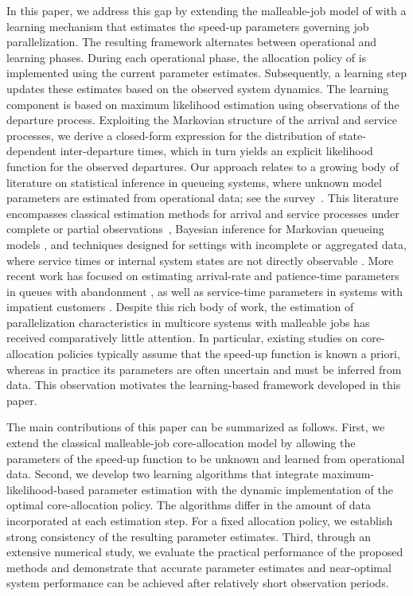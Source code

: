 \documentclass[11pt]{article}
\theoremstyle{remark}
\theoremstyle{definition}
\numberwithin{equation}{section}
\begin{document}
In this paper, we address this gap by extending the malleable-job model of \cite{berg2017} with a learning mechanism that estimates the speed-up parameters governing job parallelization. The resulting framework alternates between operational and learning phases. During each operational phase, the allocation policy of \cite{berg2017} is implemented using the current parameter estimates. Subsequently, a learning step updates these estimates based on the observed system dynamics.
The learning component is based on maximum likelihood estimation using observations of the departure process. Exploiting the Markovian structure of the arrival and service processes, we derive a closed-form expression for the distribution of state-dependent inter-departure times, which in turn yields an explicit likelihood function for the observed departures.
Our approach relates to a growing body of literature on statistical inference in queueing systems, where unknown model parameters are estimated from operational data; see the survey~\cite{asanjarani2021survey}. This literature encompasses classical estimation methods for arrival and service processes under complete or partial observations~\cite{larson1990queue, ross2007estimation}, Bayesian inference for Markovian queueing models \cite{armero1994bayesian}, and techniques designed for settings with incomplete or aggregated data, where service times or internal system states are not directly observable \cite{basawa2008, whitt2012fitting}. More recent work has focused on estimating arrival-rate and patience-time parameters in queues with abandonment \cite{bodas2023, inoue2023}, as well as service-time parameters in systems with impatient customers \cite{podorojnyi2026estimating}.
Despite this rich body of work, the estimation of parallelization characteristics in multicore systems with malleable jobs has received comparatively little attention. In particular, existing studies on core-allocation policies typically assume that the speed-up function is known a priori, whereas in practice its parameters are often uncertain and must be inferred from data. This observation motivates the learning-based framework developed in this paper.



The main contributions of this paper can be summarized as follows. First, we extend the classical malleable-job core-allocation model by allowing the parameters of the speed-up function to be unknown and learned from operational data. Second, we develop two learning algorithms that integrate maximum-likelihood-based parameter estimation with the dynamic implementation of the optimal core-allocation policy. The algorithms differ in the amount of data incorporated at each estimation step. For a fixed allocation policy, we establish strong consistency of the resulting parameter estimates. Third, through an extensive numerical study, we evaluate the practical performance of the proposed methods and demonstrate that accurate parameter estimates and near-optimal system performance can be achieved after relatively short observation periods.
\end{document}
